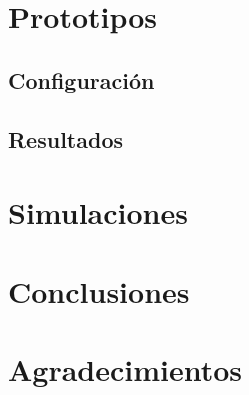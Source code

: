 \documentclass[11pt,a4paper]{article}
\begin{document}
\section{Prototipos} \label{sec:ch04}

	\subsection{Configuración}
	
	
	\subsection{Resultados}
	

\section{Simulaciones} \label{sec:ch04}


\section{Conclusiones} \label{sec:conclusions}


\section{Agradecimientos} \label{sec:conclusions}



\end{document}
